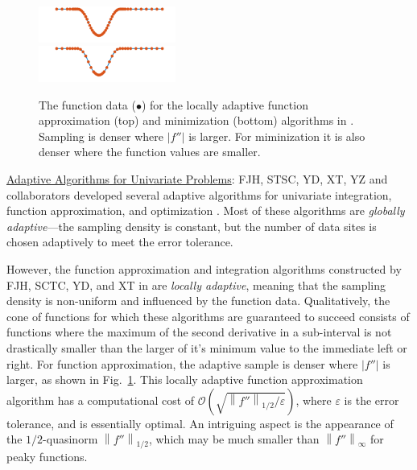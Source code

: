 \documentclass[11pt]{NSFamsart}
\newcommand{\Upara}[1]{\noindent\underline{\upshape #1}:}
\def\abs#1{\ensuremath{\left \lvert #1 \right \rvert}}
\newcommand{\norm}[2][{}]{\ensuremath{\left \lVert #2 \right \rVert}_{#1}}
\newcommand{\Order}{\mathcal{O}}
\begin{document}
\begin{figure}
	\centering
	\vspace{-1ex}
	\includegraphics[width = 0.4\textwidth]{ProgramsImages/sampling-funappxg.png}
	\\
	\includegraphics[width = 0.4\textwidth]{ProgramsImages/sampling-funming.png}

	\vspace{-2ex}
	\caption{The function data ({\color{MATLABOrange}$\bullet$}) for the locally adaptive 
	function approximation (top) and minimization (bottom) algorithms in \cite{ChoEtal17a}.  Sampling is denser where $\abs{f''}$ is larger.  For miminization it is also denser where the function values are smaller. \label{localadaptfig}}
\end{figure}

\Upara{Adaptive Algorithms for Univariate Problems} \label{sec:localadpat}
FJH, STSC, YD, XT, YZ and collaborators developed several adaptive algorithms for univariate integration, function approximation, and optimization \cite{ChoEtal17a,HicEtal14b,  Din15a, Ton14a, Zha18a}.  Most of these algorithms are \emph{globally adaptive}---the sampling density is constant, but the number of data sites is chosen adaptively to meet the error tolerance.

However, the function approximation and integration algorithms constructed by FJH, SCTC, YD, and XT in \cite{ChoEtal17a} are \emph{locally adaptive}, meaning that the sampling density is non-uniform and influenced by the function data.  Qualitatively, the cone of functions for which these algorithms are guaranteed to succeed consists of functions where the maximum of the second derivative in a sub-interval is not drastically smaller than the larger of it's minimum value to the immediate left or right.  For function approximation, the adaptive sample is denser where $\abs{f''}$ is larger, as shown in Fig.\ \ref{localadaptfig}.  This locally adaptive function approximation algorithm has a computational cost of $\Order\left(\sqrt{\norm[1/2]{f''}/\varepsilon} \right)$, where $\varepsilon$ is the error tolerance, and is essentially optimal.  An intriguing aspect is the appearance of the $1/2$-quasinorm $\norm[1/2]{f''}$, which may be much smaller than 
$\norm[\infty]{f''}$ for peaky functions.
\end{document}
